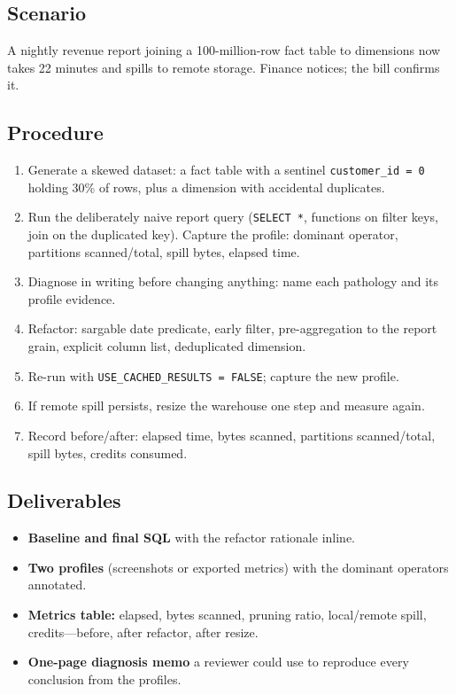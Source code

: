 \subsection*{Scenario}
A nightly revenue report joining a 100-million-row fact table to dimensions now takes 22 minutes and spills to remote storage. Finance notices; the bill confirms it.

\subsection*{Procedure}
\begin{enumerate}
    \item Generate a skewed dataset: a fact table with a sentinel \texttt{customer\_id = 0} holding 30\% of rows, plus a dimension with accidental duplicates.
    \item Run the deliberately naive report query (\texttt{SELECT *}, functions on filter keys, join on the duplicated key). Capture the profile: dominant operator, partitions scanned/total, spill bytes, elapsed time.
    \item Diagnose in writing before changing anything: name each pathology and its profile evidence.
    \item Refactor: sargable date predicate, early filter, pre-aggregation to the report grain, explicit column list, deduplicated dimension.
    \item Re-run with \texttt{USE\_CACHED\_RESULTS = FALSE}; capture the new profile.
    \item If remote spill persists, resize the warehouse one step and measure again.
    \item Record before/after: elapsed time, bytes scanned, partitions scanned/total, spill bytes, credits consumed.
\end{enumerate}

\subsection*{Deliverables}
\begin{itemize}
    \item \textbf{Baseline and final SQL} with the refactor rationale inline.
    \item \textbf{Two profiles} (screenshots or exported metrics) with the dominant operators annotated.
    \item \textbf{Metrics table:} elapsed, bytes scanned, pruning ratio, local/remote spill, credits---before, after refactor, after resize.
    \item \textbf{One-page diagnosis memo} a reviewer could use to reproduce every conclusion from the profiles.
\end{itemize}


